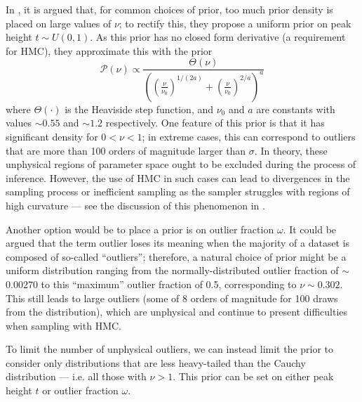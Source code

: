 \documentclass[fleqn,usenatbib]{rasti}
\begin{document}
In \citet{Feeney:2018}, it is argued that, for common choices of prior, too
much prior density is placed on large values of $\nu$; to rectify this, they
propose a uniform prior on peak height $t \sim U\left(0, 1\right)$. As this
prior has no closed form derivative (a requirement for HMC),
they approximate this with the prior
\begin{equation}
    \mathcal P\left(\nu\right) \propto
    \frac{
        \Theta(\nu)
    }{
        \left(
            \left(\frac{\nu}{\nu_0}\right)^{1 / (2 a)}
            + \left(\frac{\nu}{\nu_0}\right)^{2 / a}
        \right)^a
    }
\end{equation}
where $\Theta(\cdot)$ is the Heaviside step function, and $\nu_0$ and $a$ are
constants with values $\sim 0.55$ and $\sim 1.2$ respectively.  One feature of
this prior is that it has significant density for $0 < \nu < 1$; in extreme
cases, this can correspond to outliers that are more than 100 orders of
magnitude larger than $\sigma$. In theory, these unphysical regions of parameter
space ought to be excluded during the process of inference. However, the use of
 HMC in such cases can lead to divergences in the
sampling process or inefficient sampling as the sampler struggles with regions
of high curvature --- see the discussion of this phenomenon in
\citet{Neal:2003}.

Another option would be to place a prior is on outlier fraction $\omega$. It could be argued that
the term outlier loses its meaning when the majority of a dataset is composed of
so-called ``outliers''; therefore, a natural choice of prior might be a uniform
distribution ranging from the normally-distributed outlier fraction of
$\sim$0.00270 to this ``maximum'' outlier fraction of 0.5, corresponding to $\nu
\sim 0.302$. This still leads to large outliers (some of 8 orders of magnitude
for 100 draws from the distribution), which are unphysical and continue to
present difficulties when sampling with HMC.

To limit the number of unphysical outliers, we can instead limit the prior to
consider only distributions that are less heavy-tailed than the Cauchy
distribution --- i.e. all those with $\nu > 1$. This prior can be set on either
peak height $t$ or outlier fraction $\omega$.

\end{document}
